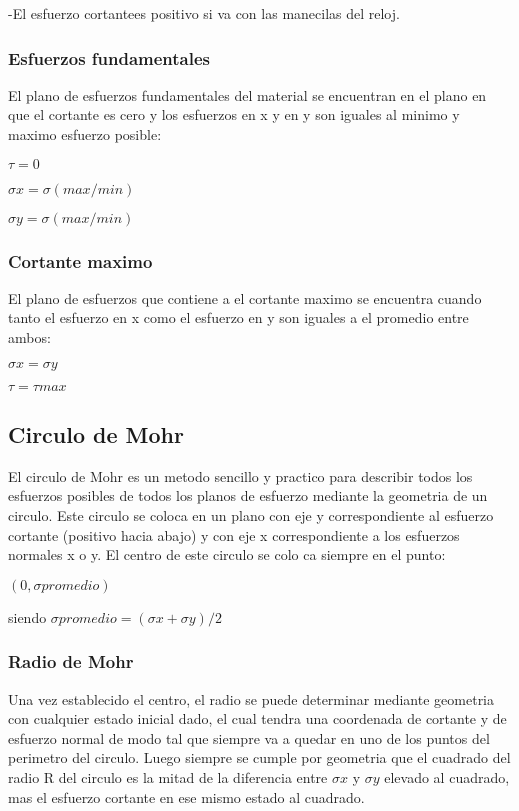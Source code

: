 \documentclass[12Pt]{article}
\begin{document}
\begin{titlepage}
-El esfuerzo cortantees positivo si va con las manecilas del reloj.

\subsubsection{Esfuerzos fundamentales}

El plano de esfuerzos fundamentales del material se encuentran en el plano en que el cortante es cero y los esfuerzos en x y en y son iguales al minimo y maximo esfuerzo posible:

$
\tau = 0 $

$ 
\sigma x = \sigma (max/min) $

$
\sigma y = \sigma (max/min) $

\subsubsection{Cortante maximo}

El plano de esfuerzos que contiene a el cortante maximo se encuentra cuando tanto el esfuerzo en x como el esfuerzo en y son iguales a el promedio entre ambos:

$ \sigma x = \sigma y $

$ \tau = \tau max $

\subsection{Circulo de Mohr}

El circulo de Mohr es un metodo sencillo y practico para describir todos los esfuerzos posibles de todos los planos de esfuerzo mediante la geometria de un circulo. Este circulo se coloca en un plano con eje y correspondiente al esfuerzo cortante (positivo hacia abajo) y con eje x correspondiente a los esfuerzos
normales x o y. El centro de este circulo se colo ca siempre en el punto:

$ (0, \sigma promedio) $

siendo $ \sigma promedio = (\sigma x + \sigma y) / 2 $

\subsubsection{Radio de Mohr}

Una vez establecido el centro, el radio se puede determinar mediante geometria con cualquier estado inicial dado, el cual tendra una coordenada de cortante y de esfuerzo normal de modo tal que siempre va a quedar en uno de los puntos del perimetro del circulo. Luego siempre se cumple por geometria que el cuadrado del radio R del circulo es la mitad de la diferencia entre $\sigma x$ y $\sigma y$ elevado al cuadrado, mas el esfuerzo cortante en ese mismo estado al cuadrado.


\end{titlepage}
\end{document}
